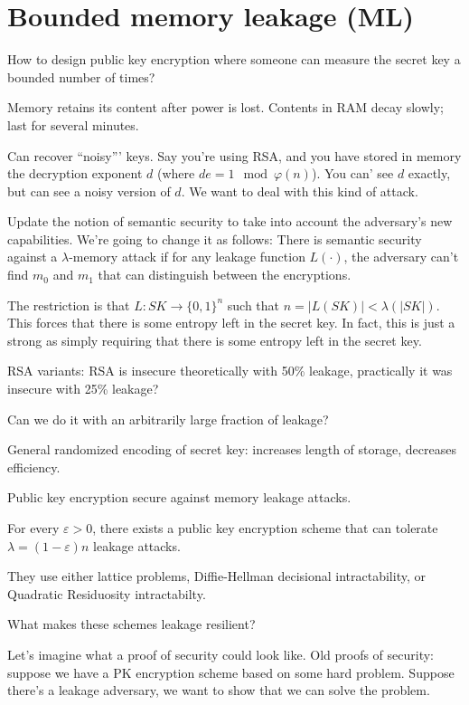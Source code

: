 \documentclass[10pt]{article}
\newcommand{\bit}{\{0,1\}}
\begin{document}
\section{Bounded memory leakage (ML)}

How to design public key encryption where someone can measure the secret key a bounded number of times?

Memory retains its content after power is lost. Contents in RAM decay slowly; last for several minutes.

Can recover ``noisy''' keys. Say you're using RSA, and you have stored in memory the decryption exponent $d$ (where $d e = 1 \mod \varphi(n)$). You can' see $d$ exactly, but can see a noisy version of $d$. We want to deal with this kind of attack.

Update the notion of semantic security to take into account the adversary's new capabilities. We're going to change it as follows: There is semantic security against a $\lambda$-memory attack if for any leakage function $L(\cdot)$, the adversary can't find $m_0$ and $m_1$ that can distinguish between the encryptions.

The restriction is that $L : SK \to \bit^n$ such that $n = |L(SK)| < \lambda(|SK|)$. This forces that there is some entropy left in the secret key. In fact, this is just a strong as simply requiring that there is some entropy left in the secret key.

RSA variants: RSA is insecure theoretically with 50\% leakage, practically it was insecure with 25\% leakage?

Can we do it with an arbitrarily large fraction of leakage?

General randomized encoding of secret key: increases length of storage, decreases efficiency.

Public key encryption secure against memory leakage attacks.

\begin{theorem}
For every $\varepsilon > 0$, there exists a public key encryption scheme that can tolerate $\lambda = (1 - \varepsilon)n$ leakage attacks.
\end{theorem}
They use either lattice problems, Diffie-Hellman decisional intractability, or Quadratic Residuosity intractabilty.

What makes these schemes leakage resilient?

Let's imagine what a proof of security could look like. Old proofs of security: suppose we have a PK encryption scheme based on some hard problem. Suppose there's a leakage adversary, we want to show that we can solve the problem.
\end{document}
